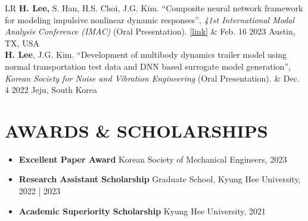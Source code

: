 \documentclass[a4paper,10pt]{extarticle}
\begin{document}
\begin{longtable}{LR}
	\textbf{H. Lee,} S. Han, H.S. Choi, J.G. Kim. “Composite neural network framework for modeling impulsive nonlinear dynamic responses”, \textit{41st International Modal Analysis Conference (IMAC)} (Oral Presentation). \href{https://link.springer.com/chapter/10.1007/978-3-031-34946-1_21}{[link]}                                                                                                           & {Feb. 16 2023 \linebreak  Austin, TX, USA}    \\
	\textbf{H. Lee}, J.G. Kim. “Development of multibody dynamics trailer model using normal transportation test data and DNN based surrogate model generation”, \textit{Korean Society for Noise and Vibration Engineering} (Oral Presentation).                                                                                                                                                                    & {Dec. 4 2022 \linebreak Jeju, South Korea}    \\
\end{longtable}

\section*{AWARDS \& SCHOLARSHIPS}
\begin{itemize}
	\item \textbf{Excellent Paper Award} \hfill Korean Society of Mechanical Engineers, 2023 %
	\item \textbf{Research Assistant Scholarship} \hfill Graduate School, Kyung Hee University, 2022 | 2023 %
	\item \textbf{Academic Superiority Scholarship} \hfill Kyung Hee University, 2021 %
\end{itemize}
\end{document}
